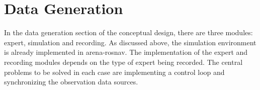 \section{Data Generation}
In the data generation section of the conceptual design, there are three modules: expert, simulation and recording. As discussed above, the simulation environment is already implemented in arena-rosnav. The implementation of the expert and recording modules depends on the type of expert being recorded. The central problems to be solved in each case are implementing a control loop and synchronizing the observation data sources. 
